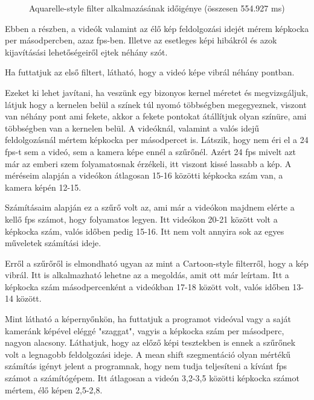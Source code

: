 \begin{figure}[h!]
\centering
{}
\caption{Aquarelle-style filter alkalmazásának időigénye (összesen 554.927 ms)}
\label{fig:pie4}
\end{figure}


Ebben a részben, a videók valamint az élő kép feldolgozási idejét mérem képkocka per másodpercben, azaz fps-ben. Illetve az esetleges képi hibákról és azok kijavításási lehetőségeiről ejtek néhány szót.


Ha futtatjuk az első filtert, látható, hogy a videó képe vibrál néhány pontban.

Ezeket ki lehet javítani, ha veszünk egy bizonyos kernel méretet és megvizsgáljuk, látjuk hogy a kernelen belül a színek túl nyomó többségben megegyeznek, viszont van néhány pont ami fekete, akkor a fekete pontokat átállítjuk olyan színüre, ami többségben van a kernelen belül. A videóknál, valamint a valós idejű feldolgozásnál mértem képkocka per másodpercet is. Látszik, hogy nem éri el a 24 fps-t sem a videó, sem a kamera képe ennél a szűrőnél. Azért 24 fps mivelt azt már az emberi szem folyamatosnak érzékeli, itt viszont kissé lassabb a kép. A méréseim alapján a videókon átlagosan 15-16 közötti képkocka szám van, a kamera képén 12-15.


Számításaim alapján ez a szűrő volt az, ami már a videókon majdnem elérte a kellő fps számot, hogy folyamatos legyen. Itt videókon 20-21 között volt a képkocka szám, valós időben pedig 15-16. Itt nem volt annyira sok az egyes műveletek számítási ideje.


Erről a szűrőről is elmondható ugyan az mint a Cartoon-style filterről, hogy a kép vibrál. Itt is alkalmazható lehetne az a megoldás, amit ott már leírtam. Itt a képkocka szám másodpercenként a videókban 17-18 között volt, valós időben 13-14 között.


Mint látható a képernyőnkön, ha futtatjuk a programot videóval vagy a saját kameránk képével eléggé "szaggat", vagyis a képkocka szám per másodperc, nagyon alacsony. Láthatjuk, hogy az előző képi tesztekben is ennek a szűrőnek volt a legnagobb feldolgozási ideje. A mean shift szegmentáció olyan mértékű számítás igényt jelent a programnak, hogy nem tudja teljesíteni a kívánt fps számot a számítógépem. Itt átlagosan a videón 3,2-3,5 közötti képkocka számot mértem, élő képen 2,5-2,8.


